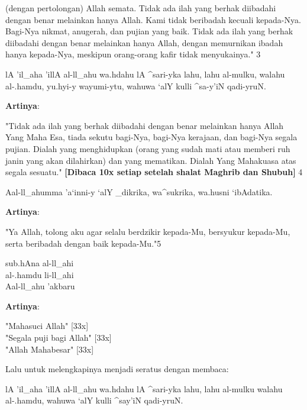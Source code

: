 \documentclass[a4paper,12pt]{article}
\begin{document}
(dengan pertolongan) Allah semata. Tidak ada ilah yang berhak diibadahi 
dengan benar melainkan hanya Allah. Kami tidak beribadah kecuali 
kepada-Nya. Bagi-Nya nikmat, anugerah, dan pujian yang baik. Tidak ada ilah 
yang berhak diibadahi dengan benar melainkan hanya Allah, dengan memurnikan 
ibadah hanya kepada-Nya, meskipun orang-orang kafir tidak menyukainya." 
{\scriptsize 3}\\
\begin{arabtext}
\noindent
lA 'il_aha 'illA al-ll_ahu wa.hdahu lA ^sari-yka lahu, lahu al-mulku, 
walahu al-.hamdu, yu.hyi-y wayumi-ytu, wahuwa `alY kulli ^sa-y'iN 
qadi-yruN.\\
\end{arabtext}
\noindent
\textbf{Artinya}:
\par
\indent
"Tidak ada ilah yang berhak diibadahi dengan benar melainkan hanya Allah 
Yang Maha Esa, tiada sekutu bagi-Nya, bagi-Nya kerajaan, dan bagi-Nya 
segala pujian. Dialah yang menghidupkan (orang yang sudah mati atau memberi 
ruh janin yang akan dilahirkan) dan yang mematikan. Dialah Yang Mahakuasa 
atas segala sesuatu." \textbf{[Dibaca 10x setiap setelah shalat Maghrib dan 
Shubuh]} {\scriptsize 4}\\
\begin{arabtext}
\noindent
Aal-ll_ahumma 'a`inni-y `alY _dikrika, wa^sukrika, wa.husni `ibAdatika.\\
\end{arabtext}
\noindent
\textbf{Artinya}:
\par
\indent
"Ya Allah, tolong aku agar selalu berdzikir kepada-Mu, bersyukur kepada-Mu, 
serta beribadah dengan baik kepada-Mu."{\scriptsize 5}\\
\begin{arabtext}
\noindent
sub.hAna al-ll_ahi\\
al-.hamdu li-ll_ahi\\
Aal-ll_ahu 'akbaru\\
\end{arabtext}
\noindent
\textbf{Artinya}:
\par
\noindent
"Mahasuci Allah" [33x]\\
"Segala puji bagi Allah" [33x]\\
"Allah Mahabesar" [33x]\\
\par
\indent
Lalu untuk melengkapinya menjadi seratus dengan membaca:
\begin{arabtext}
\noindent
lA 'il_aha 'illA al-ll_ahu wa.hdahu lA ^sari-yka lahu, lahu al-mulku walahu 
al-.hamdu, wahuwa `alY kulli ^say'iN qadi-yruN.\\
\end{arabtext}
\end{document}
